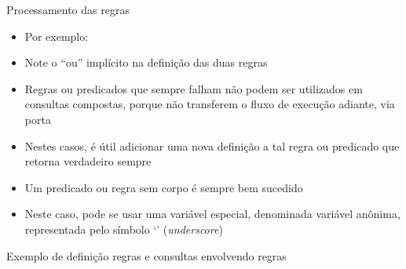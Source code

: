 \begin{frame}[fragile]{Processamento das regras}

    \begin{itemize}
        \item Por exemplo:


        \item Note o ``ou'' implícito na definição das duas regras

        \item Regras ou predicados que sempre falham não podem ser utilizados em consultas 
            compostas, porque não transferem o fluxo de execução adiante, via porta 

        \item Nestes casos, é útil adicionar uma nova definição a tal regra ou predicado que 
            retorna verdadeiro sempre

        \item Um predicado ou regra sem corpo é sempre bem sucedido

        \item Neste caso, pode se usar uma variável especial, denominada variável anônima,
            representada pelo símbolo `' (\textit{underscore})

    \end{itemize}

\end{frame}


\begin{frame}[fragile]{Exemplo de definição regras e consultas envolvendo regras}


\end{frame}

